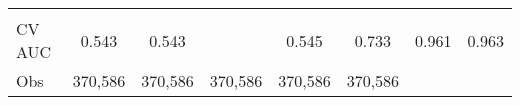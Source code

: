 \documentclass[12pt,twoside]{reedthesis}
\begin{document}
\begin{longtable}[]{@{}lccccccc@{}}
\begin{minipage}[t]{0.10\columnwidth}
  \strut
  \end{minipage} & \begin{minipage}[t]{0.10\columnwidth}\centering\strut
  \strut
  \end{minipage}\tabularnewline
  \begin{minipage}[t]{0.11\columnwidth}\raggedright\strut
  CV AUC\strut
  \end{minipage} & \begin{minipage}[t]{0.08\columnwidth}\centering\strut
  0.543\strut
  \end{minipage} & \begin{minipage}[t]{0.10\columnwidth}\centering\strut
  0.543\strut
  \end{minipage} & \begin{minipage}[t]{0.10\columnwidth}\centering\strut
  \strut
  \end{minipage} & \begin{minipage}[t]{0.10\columnwidth}\centering\strut
  0.545\strut
  \end{minipage} & \begin{minipage}[t]{0.10\columnwidth}\centering\strut
  0.733\strut
  \end{minipage} & \begin{minipage}[t]{0.10\columnwidth}\centering\strut
  0.961\strut
  \end{minipage} & \begin{minipage}[t]{0.10\columnwidth}\centering\strut
  0.963\strut
  \end{minipage}\tabularnewline
  \begin{minipage}[t]{0.11\columnwidth}\raggedright\strut
  Obs\strut
  \end{minipage} & \begin{minipage}[t]{0.08\columnwidth}\centering\strut
  370,586\strut
  \end{minipage} & \begin{minipage}[t]{0.10\columnwidth}\centering\strut
  370,586\strut
  \end{minipage} & \begin{minipage}[t]{0.10\columnwidth}\centering\strut
  370,586\strut
  \end{minipage} & \begin{minipage}[t]{0.10\columnwidth}\centering\strut
  370,586\strut
  \end{minipage} & \begin{minipage}[t]{0.10\columnwidth}\centering\strut
  370,586\strut
  \end{minipage} & \begin{minipage}[t]{0.10\columnwidth}\centering\strut

\end{minipage}
\end{longtable}
\end{document}

